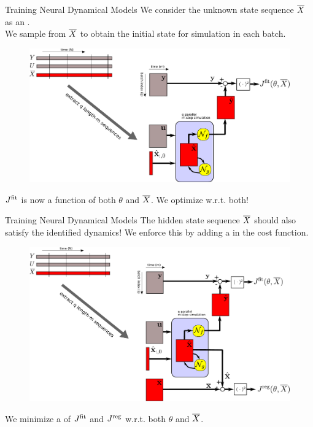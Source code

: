 \documentclass{beamer}
\begin{document}
\begin{frame}{Training Neural Dynamical Models}
We consider the unknown state sequence $\overline{X}$ as an .\\
We sample from $\overline{X}$ to obtain the initial state for simulation in each batch. 
 \begin{figure}
\centering
\includegraphics[width=.8\textwidth]{img/scheme/scheme_multistep_state_est.pdf}
\end{figure}
$J^{\rm fit}$ is now a function of both $\theta$ and $\overline{X}$. We optimize w.r.t. both!
\end{frame}

\begin{frame}{Training Neural Dynamical Models}
The hidden state sequence $\overline{X}$ should also satisfy the identified dynamics!
We enforce this by adding a  in the cost function.
 \begin{figure}
\centering
\includegraphics[width=.8\textwidth]{img/scheme/scheme_multistep_with_reg.pdf}
\end{figure}
We minimize a  of $J^{\rm fit}$ and $J^{\rm reg}$ w.r.t. both $\theta$ and $\overline{X}$.
\end{frame}
\end{document}
